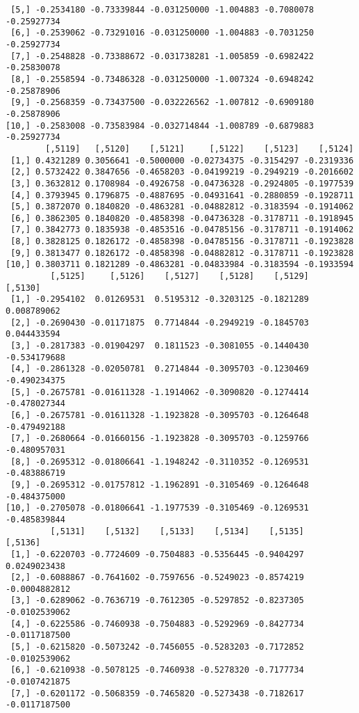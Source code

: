 \documentclass[
  letterpaper,
  DIV=11,
  numbers=noendperiod]{scrreprt}
\begin{document}
\begin{verbatim}
 [5,] -0.2534180 -0.73339844 -0.031250000 -1.004883 -0.7080078 -0.25927734
 [6,] -0.2539062 -0.73291016 -0.031250000 -1.004883 -0.7031250 -0.25927734
 [7,] -0.2548828 -0.73388672 -0.031738281 -1.005859 -0.6982422 -0.25830078
 [8,] -0.2558594 -0.73486328 -0.031250000 -1.007324 -0.6948242 -0.25878906
 [9,] -0.2568359 -0.73437500 -0.032226562 -1.007812 -0.6909180 -0.25878906
[10,] -0.2583008 -0.73583984 -0.032714844 -1.008789 -0.6879883 -0.25927734
        [,5119]   [,5120]    [,5121]     [,5122]    [,5123]    [,5124]
 [1,] 0.4321289 0.3056641 -0.5000000 -0.02734375 -0.3154297 -0.2319336
 [2,] 0.5732422 0.3847656 -0.4658203 -0.04199219 -0.2949219 -0.2016602
 [3,] 0.3632812 0.1708984 -0.4926758 -0.04736328 -0.2924805 -0.1977539
 [4,] 0.3793945 0.1796875 -0.4887695 -0.04931641 -0.2880859 -0.1928711
 [5,] 0.3872070 0.1840820 -0.4863281 -0.04882812 -0.3183594 -0.1914062
 [6,] 0.3862305 0.1840820 -0.4858398 -0.04736328 -0.3178711 -0.1918945
 [7,] 0.3842773 0.1835938 -0.4853516 -0.04785156 -0.3178711 -0.1914062
 [8,] 0.3828125 0.1826172 -0.4858398 -0.04785156 -0.3178711 -0.1923828
 [9,] 0.3813477 0.1826172 -0.4858398 -0.04882812 -0.3178711 -0.1923828
[10,] 0.3803711 0.1821289 -0.4863281 -0.04833984 -0.3183594 -0.1933594
         [,5125]     [,5126]    [,5127]    [,5128]    [,5129]      [,5130]
 [1,] -0.2954102  0.01269531  0.5195312 -0.3203125 -0.1821289  0.008789062
 [2,] -0.2690430 -0.01171875  0.7714844 -0.2949219 -0.1845703  0.044433594
 [3,] -0.2817383 -0.01904297  0.1811523 -0.3081055 -0.1440430 -0.534179688
 [4,] -0.2861328 -0.02050781  0.2714844 -0.3095703 -0.1230469 -0.490234375
 [5,] -0.2675781 -0.01611328 -1.1914062 -0.3090820 -0.1274414 -0.478027344
 [6,] -0.2675781 -0.01611328 -1.1923828 -0.3095703 -0.1264648 -0.479492188
 [7,] -0.2680664 -0.01660156 -1.1923828 -0.3095703 -0.1259766 -0.480957031
 [8,] -0.2695312 -0.01806641 -1.1948242 -0.3110352 -0.1269531 -0.483886719
 [9,] -0.2695312 -0.01757812 -1.1962891 -0.3105469 -0.1264648 -0.484375000
[10,] -0.2705078 -0.01806641 -1.1977539 -0.3105469 -0.1269531 -0.485839844
         [,5131]    [,5132]    [,5133]    [,5134]    [,5135]       [,5136]
 [1,] -0.6220703 -0.7724609 -0.7504883 -0.5356445 -0.9404297  0.0249023438
 [2,] -0.6088867 -0.7641602 -0.7597656 -0.5249023 -0.8574219 -0.0004882812
 [3,] -0.6289062 -0.7636719 -0.7612305 -0.5297852 -0.8237305 -0.0102539062
 [4,] -0.6225586 -0.7460938 -0.7504883 -0.5292969 -0.8427734 -0.0117187500
 [5,] -0.6215820 -0.5073242 -0.7456055 -0.5283203 -0.7172852 -0.0102539062
 [6,] -0.6210938 -0.5078125 -0.7460938 -0.5278320 -0.7177734 -0.0107421875
 [7,] -0.6201172 -0.5068359 -0.7465820 -0.5273438 -0.7182617 -0.0117187500

\end{verbatim}
\end{document}
